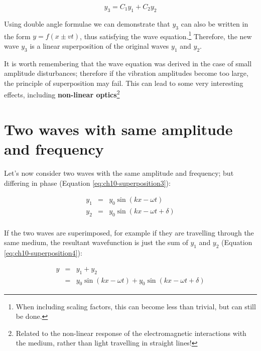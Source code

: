 \documentclass[
]{book}
\begin{document}
\begin{equation}
y_3 = C_1 y_1 + C_2 y_2
\label{eq:ch10-superposition2}
\end{equation}

Using double angle formulae we can demonstrate that \(y_3\) can also be written in the form \(y = f(x \pm vt)\), thus satisfying the wave equation.\footnote{When including scaling factors, this can become less than trivial, but can still be done.} Therefore, the new wave \(y_3\) is a linear superposition of the original waves \(y_1\) and \(y_2\).

It is worth remembering that the wave equation was derived in the case of small amplitude disturbances; therefore if the vibration amplitudes become too large, the principle of superposition may fail. This can lead to some very interesting effects, including \textbf{non-linear optics}\footnote{Related to the non-linear response of the electromagnetic interactions with the medium, rather than light travelling in straight lines!}

\hypertarget{sec:ch10-identicalwaves1}{%
\section{Two waves with same amplitude and frequency}\label{sec:ch10-identicalwaves1}}

Let's now consider two waves with the same amplitude and frequency; but differing in phase (Equation \eqref{eq:ch10-superposition3}):

\begin{equation}
\begin{array}{rcl}
y_1 &=& y_0 \sin (kx - \omega t) \\
y_2 &=& y_0 \sin (kx - \omega t +\delta ) \\
\end{array}
\label{eq:ch10-superposition3}
\end{equation}

If the two waves are superimposed, for example if they are travelling through the same medium, the resultant wavefunction is just the sum of \(y_1\) and \(y_2\) (Equation \eqref{eq:ch10-superposition4}):

\begin{equation}
\begin{array}{rcl}
y &=& y_1 + y_2 \\
  &=& y_0 \sin (kx - \omega t) + y_0 \sin (kx - \omega t +\delta )
\end{array}
\label{eq:ch10-superposition4}
\end{equation}
\end{document}
